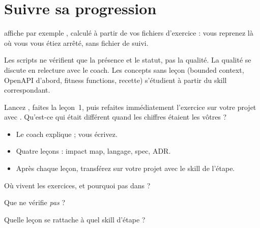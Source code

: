 \section{Suivre sa progression}
 affiche par exemple , calculé à partir de vos fichiers d'exercice : vous
reprenez là où vous vous étiez arrêté, sans fichier de suivi.

\begin{piege}
Les scripts ne vérifient que la présence et le statut, pas la qualité. La qualité se discute en relecture avec le coach. Les concepts
sans leçon (bounded context, OpenAPI d'abord, fitness functions, recette) s'étudient à partir du skill correspondant.
\end{piege}

\begin{vousjouez}
Lancez , faites la leçon~1, puis refaites immédiatement l'exercice sur votre projet avec .
Qu'est-ce qui était différent quand les chiffres étaient les vôtres ?
\end{vousjouez}

\begin{retenir}[À retenir]
\begin{itemize}
  \item Le coach explique ; vous écrivez.
  \item Quatre leçons : impact map, langage, spec, ADR.
  \item Après chaque leçon, transférez sur votre projet avec le skill de l'étape.
\end{itemize}
\end{retenir}

\begin{acquis}
  \item Où vivent les exercices, et pourquoi pas dans  ?
  \item Que ne vérifie \emph{pas}  ?
  \item Quelle leçon se rattache à quel skill d'étape ?
\end{acquis}

